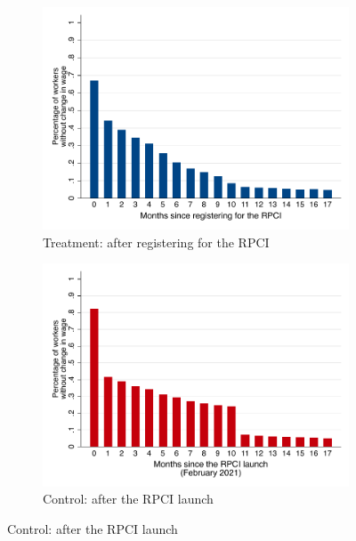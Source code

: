 \documentclass[oneside,11pt]{article}
\begin{document}
\clearpage

\begin{figure}[H]
    \caption{Percentage of workers having the same wage after the RPCI}
    \label{hist_wage_time_since_treated}
    \begin{center}
    
    \begin{subfigure}{0.49\textwidth}
    \caption{Treatment: after registering for the RPCI}
    \includegraphics[width=\textwidth]{04_Figures/muestra_1porciento/hist_wage_time_since_treated_treat.pdf}
    \end{subfigure}
    \begin{subfigure}{0.49\textwidth}
    \caption{Control: after the RPCI launch}
    \includegraphics[width=\textwidth]{04_Figures/muestra_1porciento/hist_wage_time_since_treated_control.pdf}
    \end{subfigure}
    
    \end{center}
\end{figure}
\end{document}

